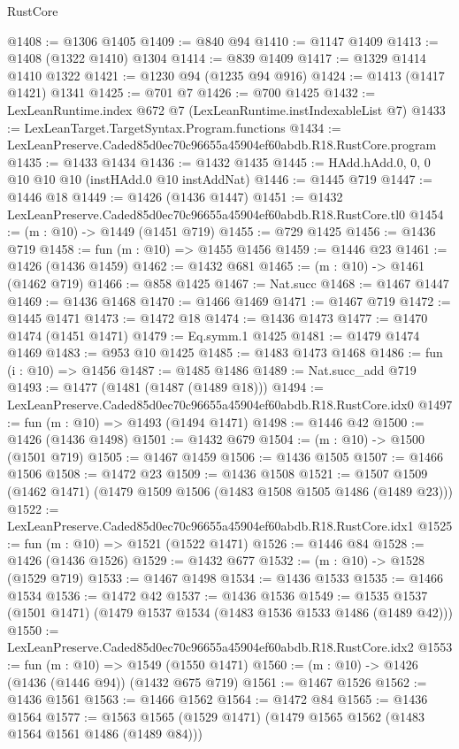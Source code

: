 \begin{lexlean}{RustCore}
\begin{coremodule}
@1408 := @1306 @1405
@1409 := @840 @94
@1410 := @1147 @1409
@1413 := @1408 (@1322 @1410) @1304
@1414 := @839 @1409
@1417 := @1329 @1414 @1410 @1322
@1421 := @1230 @94 (@1235 @94 @916)
@1424 := @1413 (@1417 @1421) @1341
@1425 := @701 @7
@1426 := @700 @1425
@1432 := LexLeanRuntime.index @672 @7 (LexLeanRuntime.instIndexableList @7)
@1433 := LexLeanTarget.TargetSyntax.Program.functions
@1434 := LexLeanPreserve.Caded85d0ec70c96655a45904ef60abdb.R18.RustCore.program
@1435 := @1433 @1434
@1436 := @1432 @1435
@1445 := HAdd.hAdd.{0, 0, 0} @10 @10 @10 (instHAdd.{0} @10 instAddNat)
@1446 := @1445 @719
@1447 := @1446 @18
@1449 := @1426 (@1436 @1447)
@1451 := @1432 LexLeanPreserve.Caded85d0ec70c96655a45904ef60abdb.R18.RustCore.tl0
@1454 := (m : @10) -> @1449 (@1451 @719)
@1455 := @729 @1425
@1456 := @1436 @719
@1458 := fun (m : @10) => @1455 @1456
@1459 := @1446 @23
@1461 := @1426 (@1436 @1459)
@1462 := @1432 @681
@1465 := (m : @10) -> @1461 (@1462 @719)
@1466 := @858 @1425
@1467 := Nat.succ
@1468 := @1467 @1447
@1469 := @1436 @1468
@1470 := @1466 @1469
@1471 := @1467 @719
@1472 := @1445 @1471
@1473 := @1472 @18
@1474 := @1436 @1473
@1477 := @1470 @1474 (@1451 @1471)
@1479 := Eq.symm.{1} @1425
@1481 := @1479 @1474 @1469
@1483 := @953 @10 @1425
@1485 := @1483 @1473 @1468
@1486 := fun (i : @10) => @1456
@1487 := @1485 @1486
@1489 := Nat.succ_add @719
@1493 := @1477 (@1481 (@1487 (@1489 @18)))
@1494 := LexLeanPreserve.Caded85d0ec70c96655a45904ef60abdb.R18.RustCore.idx0
@1497 := fun (m : @10) => @1493 (@1494 @1471)
@1498 := @1446 @42
@1500 := @1426 (@1436 @1498)
@1501 := @1432 @679
@1504 := (m : @10) -> @1500 (@1501 @719)
@1505 := @1467 @1459
@1506 := @1436 @1505
@1507 := @1466 @1506
@1508 := @1472 @23
@1509 := @1436 @1508
@1521 := @1507 @1509 (@1462 @1471) (@1479 @1509 @1506 (@1483 @1508 @1505 @1486 (@1489 @23)))
@1522 := LexLeanPreserve.Caded85d0ec70c96655a45904ef60abdb.R18.RustCore.idx1
@1525 := fun (m : @10) => @1521 (@1522 @1471)
@1526 := @1446 @84
@1528 := @1426 (@1436 @1526)
@1529 := @1432 @677
@1532 := (m : @10) -> @1528 (@1529 @719)
@1533 := @1467 @1498
@1534 := @1436 @1533
@1535 := @1466 @1534
@1536 := @1472 @42
@1537 := @1436 @1536
@1549 := @1535 @1537 (@1501 @1471) (@1479 @1537 @1534 (@1483 @1536 @1533 @1486 (@1489 @42)))
@1550 := LexLeanPreserve.Caded85d0ec70c96655a45904ef60abdb.R18.RustCore.idx2
@1553 := fun (m : @10) => @1549 (@1550 @1471)
@1560 := (m : @10) -> @1426 (@1436 (@1446 @94)) (@1432 @675 @719)
@1561 := @1467 @1526
@1562 := @1436 @1561
@1563 := @1466 @1562
@1564 := @1472 @84
@1565 := @1436 @1564
@1577 := @1563 @1565 (@1529 @1471) (@1479 @1565 @1562 (@1483 @1564 @1561 @1486 (@1489 @84)))

\end{coremodule}
\end{lexlean}
